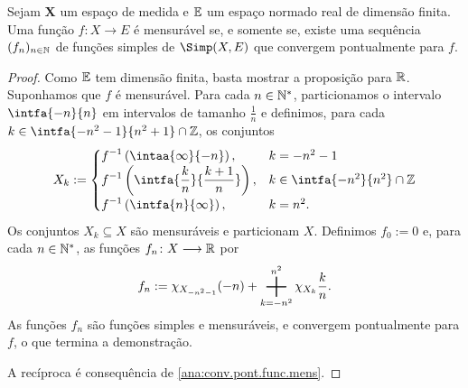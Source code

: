 \begin{prop}
Sejam $\bm X$ um espaço de medida e $\mathbb{E}$ um espaço normado real de dimensão finita. Uma função $f\colon X \to E$ é mensurável se, e somente se, existe uma sequência $(f_n)_{n \in \mathbb{N}}$ de funções simples de $\Simp(X,E)$ que convergem pontualmente para $f$.
\end{prop}
\begin{proof}
Como $\mathbb{E}$ tem dimensão finita, basta mostrar a proposição para $\mathbb{R}$. Suponhamos que $f$ é mensurável. Para cada $n \in \mathbb{N}^*$, particionamos o intervalo $\intfa{-n}{n}$ em intervalos de tamanho $\frac{1}{n}$ e definimos, para cada $k \in \intfa{-n^2-1}{n^2+1} \cap \Z$, os conjuntos
	\begin{equation*}
	X_k := 
	\begin{cases}
		\displaystyle f\inv\left( \intaa{\infty}{-n} \right),& k=-n^2-1 \\
		\displaystyle f\inv\left( \intfa{\frac{k}{n}}{\frac{k+1}{n}} \right),& k \in \intfa{-n^2}{n^2} \cap \Z \\
		\displaystyle f\inv\left( \intfa{n}{\infty} \right),& k=n^2.
	\end{cases}
	\end{equation*}
Os conjuntos $X_k \subseteq X$ são mensuráveis e particionam $X$. Definimos $f_0 := 0$ e, para cada $n \in \mathbb{N}^*$, as funções $f_n\colon X \longrightarrow \mathbb{R}$ por
	\begin{equation*}
	f_n := \idc_{X_{-n^2-1}} (-n) + \sum_{k=-n^2}^{n^2} \idc_{X_k} \frac{k}{n}.
	\end{equation*}
As funções $f_n$ são funções simples e mensuráveis, e convergem pontualmente para $f$, o que termina a demonstração.

A recíproca é consequência de \ref{ana:conv.pont.func.mens}.
\end{proof}

